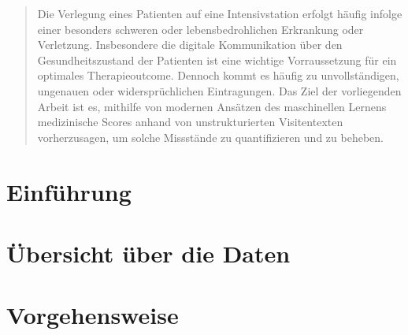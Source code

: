 \documentclass[
	abstract=true, %
	a4paper, %
	12pt, %
	bibliography=totoc, %
	headinclude, %
	headsepline,
	twoside,
	BCOR=1mm, %
	open=right %
]{scrreprt}
\begin{document}
	\pagestyle{empty}

	\renewcommand{\arraystretch}{1.15} %


	

	\begin{abstract} \thispagestyle{plain} %
	Die Verlegung eines Patienten auf eine Intensivstation erfolgt häufig infolge einer besonders schweren oder lebensbedrohlichen Erkrankung oder Verletzung. Insbesondere die digitale Kommunikation über den Gesundheitszustand der Patienten ist eine wichtige Vorraussetzung für ein optimales Therapieoutcome. Dennoch kommt es häufig zu unvollständigen, ungenauen oder widersprüchlichen Eintragungen. Das Ziel der vorliegenden Arbeit ist es, mithilfe von modernen Ansätzen des maschinellen Lernens medizinische Scores anhand von unstrukturierten Visitentexten vorherzusagen, um solche Missstände zu quantifizieren und zu beheben.
	\end{abstract}

	\pagestyle{headings} %
	\tableofcontents

	\setlength{\parskip}{.25em} %

	\chapter{Einführung}
	
	
	\chapter{Übersicht über die Daten} %
	
	
	\chapter{Vorgehensweise}\label{chap-vorgehensweise}
	
	
	
\end{document}
